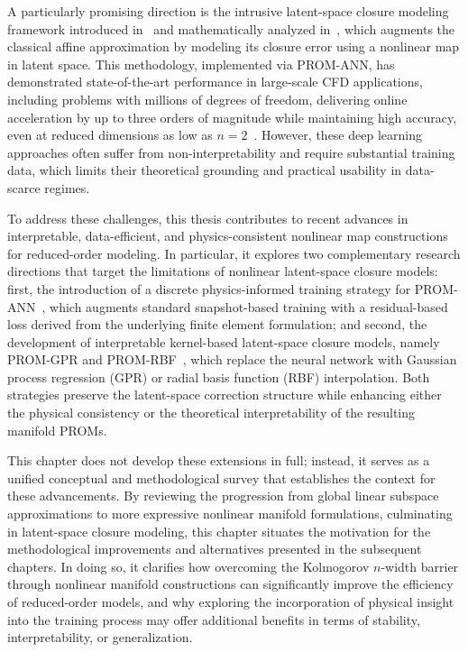 A particularly promising direction is the intrusive latent-space closure modeling framework introduced in~\cite{barnett2023neural} and mathematically analyzed in~\cite{cohen2023nonlinear}, which augments the classical affine approximation by modeling its closure error using a nonlinear map in latent space. This methodology, implemented via PROM-ANN, has demonstrated state-of-the-art performance in large-scale CFD applications, including problems with millions of degrees of freedom, delivering online acceleration by up to three orders of magnitude while maintaining high accuracy, even at reduced dimensions as low as $n = 2$~\cite{chmiel2025unified}. However, these deep learning approaches often suffer from non-interpretability and require substantial training data, which limits their theoretical grounding and practical usability in data-scarce regimes.

To address these challenges, this thesis contributes to recent advances in interpretable, data-efficient, and physics-consistent nonlinear map constructions for reduced-order modeling. In particular, it explores two complementary research directions that target the limitations of nonlinear latent-space closure models: first, the introduction of a discrete physics-informed training strategy for PROM-ANN~\cite{sibuet2025discrete}, which augments standard snapshot-based training with a residual-based loss derived from the underlying finite element formulation; and second, the development of interpretable kernel-based latent-space closure models, namely PROM-GPR and PROM-RBF~\cite{de2025nonlinear}, which replace the neural network with Gaussian process regression (GPR) or radial basis function (RBF) interpolation. Both strategies preserve the latent-space correction structure while enhancing either the physical consistency or the theoretical interpretability of the resulting manifold PROMs.

This chapter does not develop these extensions in full; instead, it serves as a unified conceptual and methodological survey that establishes the context for these advancements. By reviewing the progression from global linear subspace approximations to more expressive nonlinear manifold formulations, culminating in latent-space closure modeling, this chapter situates the motivation for the methodological improvements and alternatives presented in the subsequent chapters. In doing so, it clarifies how overcoming the Kolmogorov $n$-width barrier through nonlinear manifold constructions can significantly improve the efficiency of reduced-order models, and why exploring the incorporation of physical insight into the training process may offer additional benefits in terms of stability, interpretability, or generalization.

